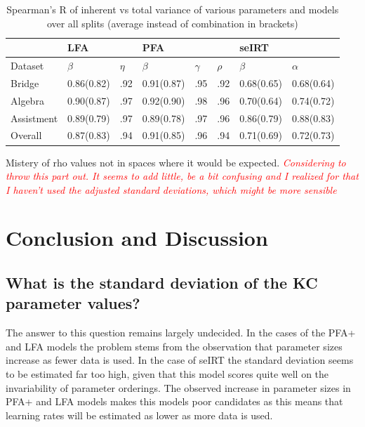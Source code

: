 \documentclass{scrartcl}
\newcommand\todo[1]{\textit{\textcolor{red}{#1}}}
\begin{document}
\begin{center}
\begin{table}[!htbp]
\begin{tabular}{| l || l | l ||l|l |l||l|l|}

    \hline
     & LFA  & & PFA & & &seIRT &   \\ \hline
    Dataset & $\beta$ & $\eta$ & $\beta$ & $\gamma$ & $\rho$ & $\beta$ & $\alpha$  \\ \hline
    Bridge     & 0.86(0.82) & .92 & 0.91(0.87) & .95 & .92 & 0.68(0.65)&0.68(0.64) \\ \hline
    Algebra    & 0.90(0.87) & .97 & 0.92(0.90) & .98 & .96 & 0.70(0.64)&0.74(0.72) \\ \hline
    Assistment & 0.89(0.79) & .97 & 0.89(0.78) & .97 & .96 & 0.86(0.79)&0.88(0.83) \\ \hline \hline
    Overall    & 0.87(0.83) & .94 & 0.91(0.85) & .96 & .94 & 0.71(0.69)&0.72(0.73) \\
    \hline
\end{tabular}
\caption{Spearman's R of inherent vs total variance of various parameters and models over all splits (average instead of combination in brackets)}
\label{tab:intorank}
\end{table}
\end{center}



Mistery of rho values not in spaces where it would be expected.
\todo{Considering to throw this part out. It seems to add little, be a bit confusing and I realized for that I haven't used the adjusted standard deviations, which might be more sensible}


\section{Conclusion and Discussion}
\subsection{What is the standard deviation of the KC parameter values?}
The answer to this question remains largely undecided. In the cases of the PFA+ and LFA models the problem stems from the observation that parameter sizes increase as fewer data is used. In the case of seIRT the standard deviation seems to be estimated far too high, given that this model scores quite well on the invariability of parameter orderings. The observed increase in parameter sizes in PFA+ and LFA models makes this models poor candidates as this means that learning rates will be estimated as lower as more data is used.
\end{document}
